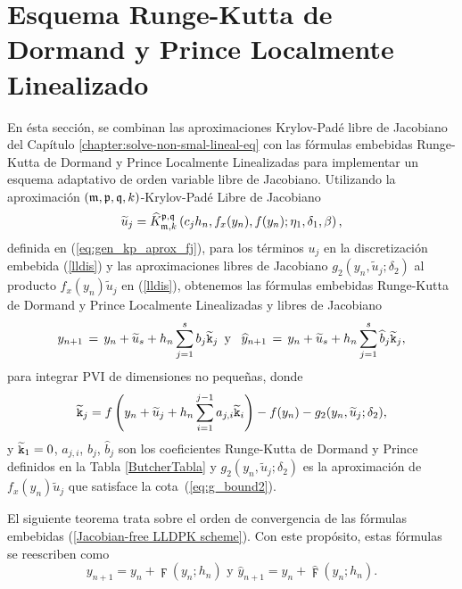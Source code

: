 \section{Esquema Runge-Kutta de Dormand y Prince Localmente Linealizado}
En ésta sección, se combinan las aproximaciones Krylov-Padé libre de Jacobiano del Capítulo \ref{chapter:solve-non-smal-lineal-eq} con las fórmulas embebidas Runge-Kutta de Dormand y Prince Localmente Linealizadas para implementar un esquema adaptativo de orden variable libre de Jacobiano.
Utilizando la aproximación $(\mathfrak{m} , \mathfrak{p} ,\mathfrak{q} , k)$-Krylov-Padé Libre de Jacobiano
\begin{equation}
\widetilde{u}_j=\widehat{K}_{\mathfrak{m},k}^{\mathfrak{p},\mathfrak{q}}\left(c_j h_n, f_x(y_n) , f(y_n); \eta_1, \delta_1, \beta \right) \label{eq:approx_u_j},
\end{equation}
definida en (\ref{eq:gen_kp_aprox_fj}), para los términos $u_j$ en la discretización embebida (\ref{lldis}) y las aproximaciones libres de Jacobiano $g_2(y_n,\widetilde{u}_j;\delta_2)$ al producto  $f_x(y_n)\widetilde{u}_j$ en (\ref{lldis}), obtenemos las fórmulas embebidas Runge-Kutta de Dormand y Prince Localmente Linealizadas y libres de Jacobiano
\begin{equation}
	y_{n+1}\,=\,y_n+\widetilde{u}_s+h_n \sum_{j=1}^{s}b_j \widetilde{\mathtt{k}}_j \,\,\, \text{y} \,\,\, \
	\widehat{y}_{n+1}\,=\, y_n+\widetilde{u}_s+h_n \sum_{j=1}^{s}\widehat{b}_j \widetilde{\mathtt{k}}_j, \label{Jacobian-free LLDPK scheme}
	\end{equation}
para integrar PVI de dimensiones no pequeñas, donde
\begin{equation*}
	\widetilde{\mathtt{k}}_j = f\left( y_n+\widetilde{u}_j+h_n \sum_{i=1}^{j-1}a_{j,i}\widetilde{\mathtt{k}}_i \right) - f( y_n) - g_2(y_n,\widetilde{u}_j;\delta_2),
\end{equation*}
y $\widetilde{\mathtt{k}}_1=0$, $a_{j,i}$, $b_j$, $\widehat{b}_j$ son los coeficientes Runge-Kutta de Dormand y Prince definidos en la Tabla \ref{ButcherTabla} y  $g_2(y_n,\widetilde{u}_j;\delta_2)$ es la aproximación de $f_x(y_n)\widetilde{u}_j$ que satisface la cota~(\ref{eq:g_bound2}).

El siguiente teorema trata sobre el orden de convergencia de las fórmulas embebidas (\ref{Jacobian-free LLDPK scheme}). Con este propósito, estas fórmulas se reescriben como
\begin{equation*}
    y_{n+1}=y_{n}+\digamma (y_{n};h_{n})\text{ \ \ \ \ y \ \ \ \ }\widehat{y}_{n+1}=y_{n}+\widehat{\digamma }(y_{n};h_{n}).
\end{equation*}



